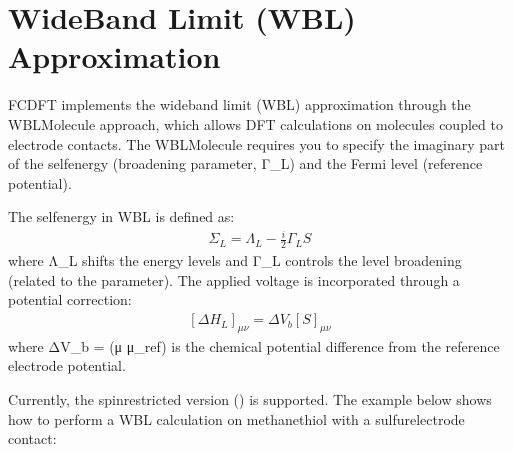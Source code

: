 \documentclass[letterpaper,10pt,english]{sphinxmanual}
\begin{document}
\section{Wide\sphinxhyphen{}Band Limit (WBL) Approximation}
\label{\detokenize{examples:wide-band-limit-wbl-approximation}}
\sphinxAtStartPar
FC\sphinxhyphen{}DFT implements the wide\sphinxhyphen{}band limit (WBL) approximation through the WBL\sphinxhyphen{}Molecule approach, which allows DFT calculations on molecules coupled to electrode contacts. The WBL\sphinxhyphen{}Molecule requires you to specify the imaginary part of the self\sphinxhyphen{}energy (broadening parameter, Γ\_L) and the Fermi level (reference potential).

\sphinxAtStartPar
The self\sphinxhyphen{}energy in WBL is defined as:
\begin{equation*}
\begin{split}\Sigma_L = \Lambda_L - \frac{i}{2}\Gamma_L S\end{split}
\end{equation*}
\sphinxAtStartPar
where Λ\_L shifts the energy levels and Γ\_L controls the level broadening (related to the  parameter). The applied voltage is incorporated through a potential correction:
\begin{equation*}
\begin{split}[\Delta H_L]_{\mu\nu} = \Delta V_b [S]_{\mu\nu}\end{split}
\end{equation*}
\sphinxAtStartPar
where ΔV\_b = \sphinxhyphen{}(μ \sphinxhyphen{} μ\_ref) is the chemical potential difference from the reference electrode potential.

\sphinxAtStartPar
Currently, the spin\sphinxhyphen{}restricted version () is supported. The example below shows how to perform a WBL calculation on methanethiol with a sulfur\sphinxhyphen{}electrode contact:
\end{document}
